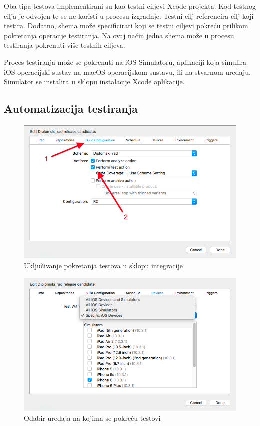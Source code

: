 \documentclass[times, utf8, diplomski, numeric]{fer}
\begin{document}
Oba tipa testova implementirani su kao testni ciljevi Xcode projekta. Kod testnog cilja je odvojen te se ne koristi u procesu izgradnje. Testni cilj referencira cilj koji testira. Dodatno, shema može specificirati koji se testni ciljevi pokreću prilikom pokretanja operacije testiranja. Na ovaj način jedna shema može u procesu testiranja pokrenuti više testnih ciljeva.

Proces testiranja može se pokrenuti na iOS Simulatoru, aplikaciji koja simulira iOS operacijski sustav na macOS operacijskom sustavu, ili na stvarnom uređaju. Simulator se instalira u sklopu instalacije Xcode aplikacije.

\subsection{Automatizacija testiranja}

\begin{figure}[b!]
\centering
\includegraphics[scale=0.5]{XcodeServerTestAction}
\caption{Uključivanje pokretanja testova u sklopu integracije}
\label{fig:XcodeServerTestAction}
\end{figure}

\begin{figure}
\centering
\includegraphics[scale=0.5]{XcodeServerTestDevices}
\caption{Odabir uređaja na kojima se pokreću testovi}
\label{fig:XcodeServerTestDevices}
\end{figure}
\end{document}
